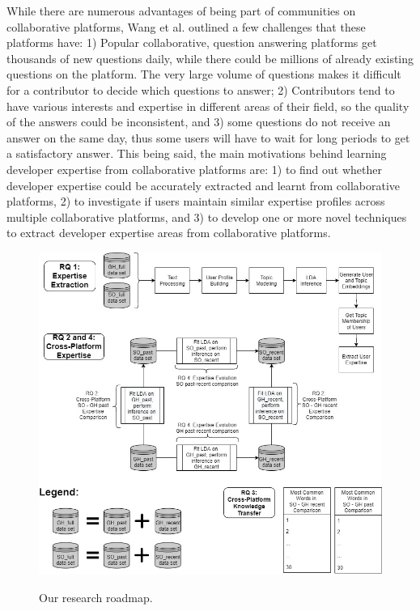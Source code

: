             While there are numerous advantages of being part of communities on collaborative platforms, Wang et al. \cite{wang2018survey} outlined a few challenges that these platforms have: 1) Popular collaborative, question answering platforms get thousands of new questions daily, while there could be millions of already existing questions on the platform. The very large volume of questions makes it difficult for a contributor to decide which questions to answer; 2) Contributors tend to have various interests and expertise in different areas of their field, so the quality of the answers could be inconsistent, and 3) some questions do not receive an answer on the same day, thus some users will have to wait for long periods to get a satisfactory answer. 
            This being said, the main motivations behind learning developer expertise from collaborative platforms are: 1) to find out whether developer expertise could be accurately extracted and learnt from collaborative platforms, 2) to investigate if users maintain similar expertise profiles across multiple collaborative platforms, and 3) to develop one or more novel techniques to extract developer expertise areas from collaborative platforms.
            
             \begin{figure}[!ht]
                  \centering
                  \includegraphics[width=\textwidth]{figures/roadmap.jpg}\\
                  \caption{Our research roadmap.}
                  \label{fig:roadmap.jpg}
            \end{figure}
    
